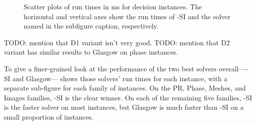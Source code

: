 \begin{figure}[htb]
{        \label{figure:TODO}
    }
    \caption{Scatter plots of run times in ms for decision instances.
            The horizontal and vertical axes show the run times of \McSplit-SI and the
            solver named in the subfigure caption, respectively.}
    \label{figure:si-decision-scatter}
\end{figure}

TODO: mention that D1 variant isn't very good.
TODO: mention that D2 variant has similar results to Glasgow on phase instances.

\FloatBarrier

To give a finer-grained look at the performance of the two best solvers overall---\McSplit-SI and
Glasgow--- shows those solvers' run times for each
instance, with a separate sub-figure for each family of instances.  On the PR, Phase, Meshes,
and Images families, \McSplit-SI is the clear winner.   On each of
the remaining five families, \McSplit-SI is the faster solver on most instances, but Glasgow
is much faster than \McSplit-SI on a small proportion of instances.

